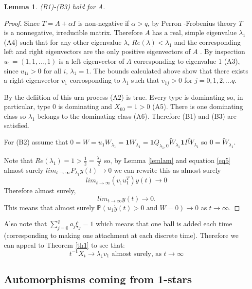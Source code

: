 \documentclass[12pt]{article} %
\newtheorem{lem}[thm]{Lemma}
\theoremstyle{definition}
\begin{document}
\begin{lem}\label{lem:4.2}
 (B1)-(B3) hold for $A$.
\end{lem}
\begin{proof}
Since $T = A + \alpha I$ is non-negative if $\alpha > q$, by Perron	-Frobenius theory $T$ is a nonnegative, irreducible matrix.  Therefore $A$ has a real, simple eigenvalue $\lambda_{1}$ (A4) such that for any other eigenvalue $\lambda$,  $Re(\lambda) < \lambda_{1}$ and the corresponding left and right eigenvectors are the only positive eigenvectors of $A$ \cite{Seneta} .  By inspection $u_{1} = (1,1,\dots,1)$ is a left eigenvector of $A$ corresponding to eigenvalue 1 (A3), since $u_{1i} > 0$ for all $i$, $\lambda_{1} = 1$. The bounds calculated above show that there exists a right eigenvector $v_{1}$ corrosponding to $\lambda_{1}$ such that $v_{1j}>0$ for $j = 0,1,2,\dots q$.  

By the defiition of this urn process (A2) is true. Every type is dominating so, in particular, type 0 is dominating and $X_{00} = 1 >0$ (A5).  There is one dominating class so $\lambda_{1}$ belongs to the dominating class (A6).  Therefore (B1) and (B3) are satisfied. 
 
For (B2) assume that $0 = W = u_{1}W_{\lambda_{1}} = \bm{1}W_{\lambda_{1}} = \bm{1} Q_{\lambda_{1},0}\tilde{W}_{\lambda_{1}}  \bm{1}I\tilde{W}_{\lambda_{1}}$ so $0 = \tilde{W}_{\lambda_{1}}$.

Note that $Re(\lambda_{1}) = 1 > \frac{1}{2}  = \frac{\lambda_{1}}{2}$ so, by Lemma \ref{lemlam} and equation \ref{eq5} almost surely $lim_{t\rightarrow\infty}P_{\lambda_{1}}y(t) \rightarrow 0$ we can rewrite this as almost surely
\[lim_{t\rightarrow\infty}(v_{1}u_{1}^{T})y(t) \rightarrow 0\] Therefore almost surely,
\[lim_{t\rightarrow\infty}y(t) \rightarrow 0.\]
This means that almost surely $\mathbb{P}(u_{1} \dot y(t) > 0 \text{  and  } W = 0)\rightarrow 0$ as $t\rightarrow\infty$.
\end{proof}

Also note that $\sum_{j=0}^{q}a_{j}\xi_{j} = 1$ which means that one ball is added each time (corresponding to making one attachment at each discrete time).  Therefore we can appeal to Theorem \ref{th1} to see that:
 \[t^{-1}X_{t} \rightarrow \lambda_{1}v_{1} \text{  almost surely,  as   } t \rightarrow\infty\]

\subsection{Automorphisms coming from 1-stars}
\end{document}
